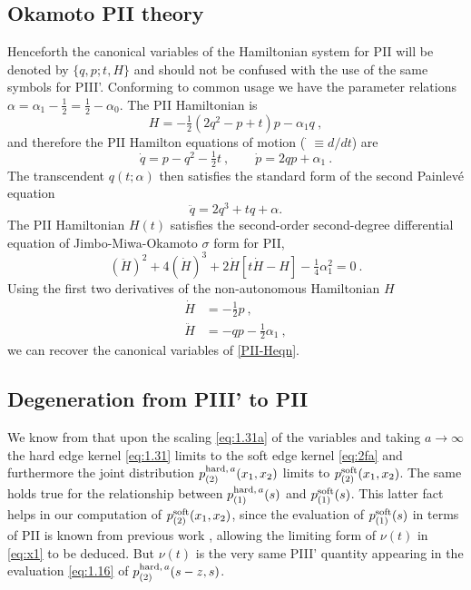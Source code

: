 \documentclass[10pt,reqno]{amsart}
\theoremstyle{plain}
\theoremstyle{definition}
\theoremstyle{remark}
\begin{document}
\subsection{Okamoto PII theory}
Henceforth the canonical variables of the Hamiltonian system for PII will be denoted by $ \{q,p;t,H \} $ 
and should not be confused with the use of the same symbols for PIII'. Conforming to common usage we have 
the parameter relations $ \alpha = \alpha_1 - {\tfrac{1}{2}} = {\tfrac{1}{2}} - \alpha_0 $. The PII Hamiltonian is
\begin{equation}
  H = -{\tfrac{1}{2}} (2q^2 - p + t)p - \alpha_1 q \ ,
\label{Ham-PII}
\end{equation}
and therefore the PII Hamilton equations of motion ($ \dot{\phantom{q}} \equiv d/dt $) are
\begin{equation}
  \dot{q} = p - q^2 - {\tfrac{1}{2}} t\ , \qquad
  \dot{p} = 2qp + \alpha_1 \ .
\label{PII-Heqn}
\end{equation}
The transcendent $ q(t;\alpha) $ then satisfies the standard form of the second Painlev\'e equation
\begin{equation}
 \ddot{q} = 2q^3+tq+\alpha .
\end{equation} 
The PII Hamiltonian $ H(t) $ satisfies the second-order second-degree differential 
equation of Jimbo-Miwa-Okamoto $\sigma$ form for PII,
\begin{equation} 
  \left( \ddot{H} \right)^2 + 4\left( \dot{H} \right)^3 + 2\dot{H}[t\dot{H}-H] - {\tfrac{1}{4}}\alpha^2_1 = 0 \ .
\label{PII-Hode}
\end{equation}
Using the first two derivatives of the non-autonomous Hamiltonian $H$
\begin{equation}
\begin{split}
  \dot{H}  & = -{\tfrac{1}{2}} p  \ ,\\
  \ddot{H} & = -qp-{\tfrac{1}{2}}\alpha_1 \ ,
\end{split}
\label{PII-derH}
\end{equation}
we can recover the canonical variables of \eqref{PII-Heqn}.

\subsection{Degeneration from PIII' to PII}
We know from \cite{BF_2003} that upon the scaling \eqref{eq:1.31a} of the variables and taking 
$a \rightarrow \infty$ the hard edge kernel \eqref{eq:1.31} limits to the soft edge kernel \eqref{eq:2fa}
and furthermore the joint distribution $p_{(2)}^{{\rm hard,}\, a}(x_1,x_2)$ limits to 
$p_{(2)}^{{\rm soft}}(x_1,x_2)$. The same holds true for the relationship between $p_{(1)}^{{\rm hard,}\, a}(s)$
and $p_{(1)}^{{\rm soft}}(s)$. This latter fact helps in our computation of $p_{(2)}^{{\rm soft}}(x_1,x_2)$,
since the evaluation of $p_{(1)}^{{\rm soft}}(s)$ in terms of PII is known from previous work \cite{rmt_Fo}, \cite{FW_2001a} allowing
the limiting form of $\nu(t)$ in \eqref{eq:x1} to be deduced. But $\nu(t)$ is the very same PIII' quantity 
appearing in the evaluation  \eqref{eq:1.16} of  $p_{(2)}^{{\rm hard,}\, a}(s-z,s)$.
 
\end{document}
